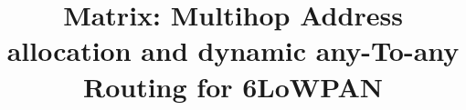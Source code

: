 \documentclass{sig-alternate-05-2015}
\begin{document}






%

\title{Matrix: Multihop Address allocation and dynamic any-To-any Routing for
6LoWPAN}


%
%
%
%
%
\end{document}
